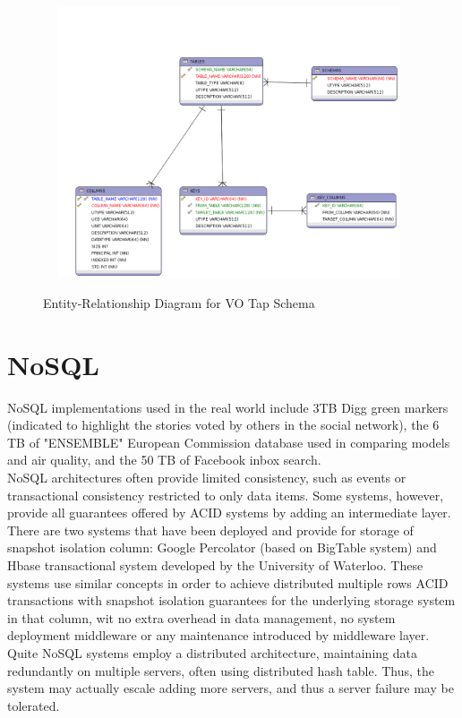 \begin{figure}
\centering
\includegraphics[width=11cm,height=8cm]{images/erd_postgres.png}\\
\caption{Entity-Relationship Diagram for VO Tap Schema}
\end{figure}


\section{NoSQL}

NoSQL implementations used in the real world include 3TB Digg green markers (indicated to highlight the stories voted by others in the social network), the 6 TB of "ENSEMBLE" European Commission database used in comparing models and air quality, and the 50 TB of Facebook inbox search.\\

NoSQL architectures often provide limited consistency, such as events or transactional consistency restricted to only data items. Some systems, however, provide all guarantees offered by ACID systems by adding an intermediate layer. There are two systems that have been deployed and provide for storage of snapshot isolation column: Google Percolator (based on BigTable system) and Hbase transactional system developed by the University of Waterloo. These systems use similar concepts in order to achieve distributed multiple rows ACID transactions with snapshot isolation guarantees for the underlying storage system in that column, wit no extra overhead in data management, no system deployment middleware or any maintenance introduced by middleware layer.\\

Quite NoSQL systems employ a distributed architecture, maintaining data redundantly on multiple servers, often using distributed hash table. Thus, the system may actually escale adding more servers, and thus a server failure may be tolerated.\\


